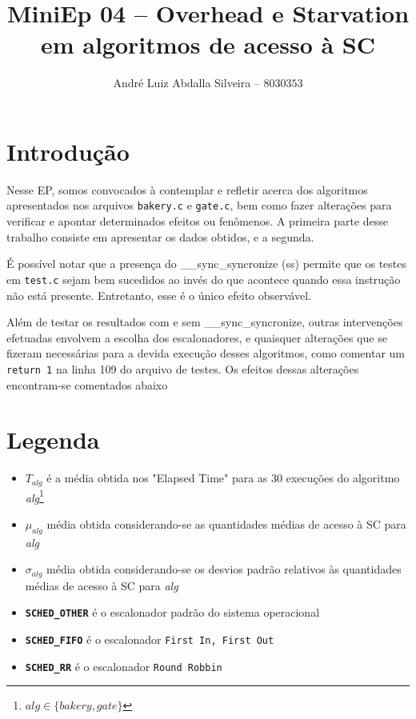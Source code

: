 \documentclass[12pt]{article}
\title{MiniEp 04 -- Overhead e Starvation em algoritmos de acesso à SC}
\author{André Luiz Abdalla Silveira -- $8030353$}
\begin{document}
\maketitle
\section*{Introdução}

Nesse EP, somos convocados à contemplar e refletir acerca dos algoritmos apresentados nos arquivos \texttt{bakery.c} e \texttt{gate.c}, bem como fazer alterações para verificar e apontar determinados efeitos ou fenômenos. A primeira parte desse trabalho consiste em apresentar os dados obtidos, e a segunda. 

É possível notar que a presença do \_\_sync\_syncronize (ss) permite que os testes em \texttt{test.c} sejam bem sucedidos ao invés do que acontece quando essa instrução não está presente. Entretanto, esse é o único efeito observável.

Além de testar os resultados com e sem \_\_sync\_syncronize, outras intervenções efetuadas envolvem a escolha dos escalonadores, e quaisquer alterações que se fizeram necessárias para a devida execução desses algoritmos, como comentar um \texttt{return 1} na linha 109 do arquivo de testes. Os efeitos dessas alterações encontram-se comentados abaixo

\section*{Legenda}
\begin{itemize}
\item $T_{alg}$ é a média obtida nos "Elapsed Time" para as 30 execuções do algoritmo \textit{alg}\footnote{$\mathit{alg} \in \{bakery, gate\}$}
\item $\mu_{alg}$ média obtida considerando-se as quantidades médias de acesso à SC para \textit{alg}
\item $\sigma_{alg}$ média obtida considerando-se os desvios padrão relativos às quantidades médias de acesso à SC para \textit{alg}
\item \texttt{\textbf{SCHED\_OTHER}} é o escalonador padrão do sistema operacional
\item \texttt{\textbf{SCHED\_FIFO}} é o escalonador \texttt{First In, First Out}
\item \texttt{\textbf{SCHED\_RR}} é o escalonador \texttt{Round Robbin}
\end{itemize}
 \newpage
\end{document}
